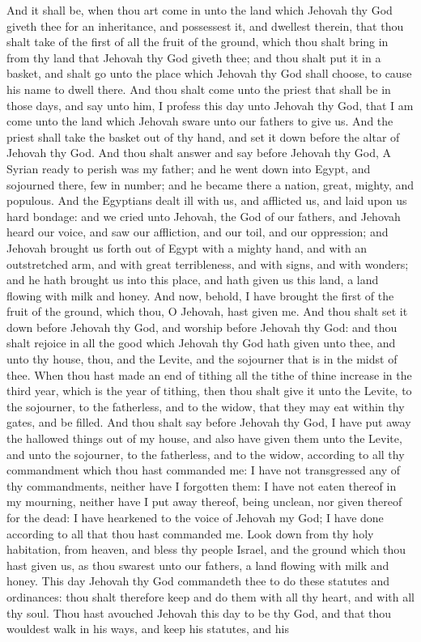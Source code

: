 And it shall be, when thou art come in unto the land which Jehovah thy God giveth thee for an inheritance, and possessest it, and dwellest therein, that thou shalt take of the first of all the fruit of the ground, which thou shalt bring in from thy land that Jehovah thy God giveth thee; and thou shalt put it in a basket, and shalt go unto the place which Jehovah thy God shall choose, to cause his name to dwell there. And thou shalt come unto the priest that shall be in those days, and say unto him, I profess this day unto Jehovah thy God, that I am come unto the land which Jehovah sware unto our fathers to give us. And the priest shall take the basket out of thy hand, and set it down before the altar of Jehovah thy God. And thou shalt answer and say before Jehovah thy God, A Syrian ready to perish was my father; and he went down into Egypt, and sojourned there, few in number; and he became there a nation, great, mighty, and populous. And the Egyptians dealt ill with us, and afflicted us, and laid upon us hard bondage: and we cried unto Jehovah, the God of our fathers, and Jehovah heard our voice, and saw our affliction, and our toil, and our oppression; and Jehovah brought us forth out of Egypt with a mighty hand, and with an outstretched arm, and with great terribleness, and with signs, and with wonders; and he hath brought us into this place, and hath given us this land, a land flowing with milk and honey. And now, behold, I have brought the first of the fruit of the ground, which thou, O Jehovah, hast given me. And thou shalt set it down before Jehovah thy God, and worship before Jehovah thy God: and thou shalt rejoice in all the good which Jehovah thy God hath given unto thee, and unto thy house, thou, and the Levite, and the sojourner that is in the midst of thee.  When thou hast made an end of tithing all the tithe of thine increase in the third year, which is the year of tithing, then thou shalt give it unto the Levite, to the sojourner, to the fatherless, and to the widow, that they may eat within thy gates, and be filled. And thou shalt say before Jehovah thy God, I have put away the hallowed things out of my house, and also have given them unto the Levite, and unto the sojourner, to the fatherless, and to the widow, according to all thy commandment which thou hast commanded me: I have not transgressed any of thy commandments, neither have I forgotten them: I have not eaten thereof in my mourning, neither have I put away thereof, being unclean, nor given thereof for the dead: I have hearkened to the voice of Jehovah my God; I have done according to all that thou hast commanded me. Look down from thy holy habitation, from heaven, and bless thy people Israel, and the ground which thou hast given us, as thou swarest unto our fathers, a land flowing with milk and honey.  This day Jehovah thy God commandeth thee to do these statutes and ordinances: thou shalt therefore keep and do them with all thy heart, and with all thy soul. Thou hast avouched Jehovah this day to be thy God, and that thou wouldest walk in his ways, and keep his statutes, and his 